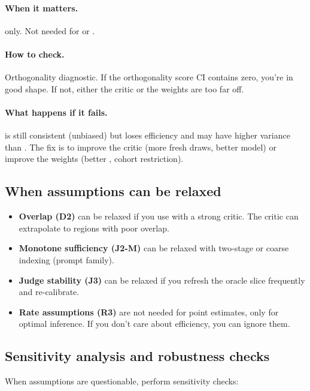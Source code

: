 \paragraph{When it matters.} \dr{} only. Not needed for \dm{} or \ips.

\paragraph{How to check.} Orthogonality diagnostic. If the orthogonality score CI contains zero, you're in good shape. If not, either the critic or the weights are too far off.

\paragraph{What happens if it fails.} \dr{} is still consistent (unbiased) but loses efficiency and may have higher variance than \ips. The fix is to improve the critic (more fresh draws, better model) or improve the weights (better \simcal, cohort restriction).

\subsection{When assumptions can be relaxed}

\begin{itemize}
\item \textbf{Overlap (D2)} can be relaxed if you use \dr{} with a strong critic. The critic can extrapolate to regions with poor overlap.
\item \textbf{Monotone sufficiency (J2-M)} can be relaxed with two-stage \autocal{} or coarse indexing (prompt family).
\item \textbf{Judge stability (J3)} can be relaxed if you refresh the oracle slice frequently and re-calibrate.
\item \textbf{Rate assumptions (R3)} are not needed for point estimates, only for optimal inference. If you don't care about efficiency, you can ignore them.
\end{itemize}

\subsection{Sensitivity analysis and robustness checks}

When assumptions are questionable, perform sensitivity checks:


